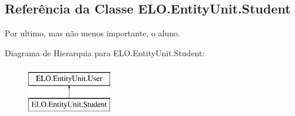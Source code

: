 \hypertarget{classELO_1_1EntityUnit_1_1Student}{}\subsection{Referência da Classe E\+L\+O.\+Entity\+Unit.\+Student}
\label{classELO_1_1EntityUnit_1_1Student}


Por ultimo, mas não menos importante, o aluno.  


Diagrama de Hierarquia para E\+L\+O.\+Entity\+Unit.\+Student\+:\begin{figure}[H]
\begin{center}
\leavevmode
\includegraphics[height=2.000000cm]{dd/d1d/classELO_1_1EntityUnit_1_1Student}
\end{center}
\end{figure}

